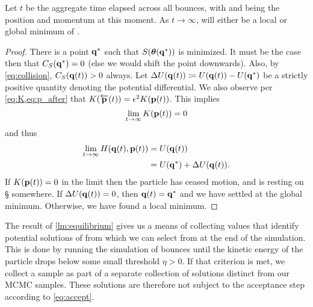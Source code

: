 \begin{lemma}
    \label{lm:equilibrium}
    Let $t$ be the aggregate time elapsed across all bounces, with \qt{} and
    \pt{} being the position and momentum at this moment. As $t \rightarrow
    \infty$, \thetaof{\qt{}} will either be a local or global minimum of
    \surface{}.
\end{lemma}
\begin{proof}
    There is a point $\mathbf{q}{}^*$ such that $S(\boldsymbol{\theta}(\mathbf{q}{}^*))$ is minimized.
    It must be the case then that $C_{S}({\mathbf{q}{}^*}) = 0$ (else we would shift the
    point downwards). Also, by \cref{eq:collision}, $C_{S}({\mathbf{q}(t){}}) > 0$ always.
    Let $\Delta U(\mathbf{q}(t){}) \coloneqq U(\mathbf{q}(t){}) - U(\mathbf{q}{}^*)$ be a strictly positive
    quantity denoting the potential differential. We also observe per
    \cref{eq:K,eq:p_after} that $K(\overleftarrow{\mathbf{p}}(t)) = \epsilon^2
    K(\mathbf{p}(t){})$. This implies
    \begin{equation*}
        \lim_{t \rightarrow \infty} K(\mathbf{p}(t){}) = 0
    \end{equation*}
    and thus
    \begin{align*}
        \lim_{t \rightarrow \infty} H(\mathbf{q}(t){}, \mathbf{p}(t){}) &= U(\mathbf{q}(t){}) \\
        &= U(\mathbf{q}{}^*) + \Delta U(\mathbf{q}(t){}).
    \end{align*}
    If $K(\mathbf{p}(t){}) = 0$ in the limit then the particle has ceased motion, and is
    resting on \S{} somewhere. If $\Delta U(\mathbf{q}(t){}) = 0$, then $\mathbf{q}(t){} = \mathbf{q}{}^*$
    and we have settled at the global minimum. Otherwise, we have found a local
    minimum.
\end{proof}

The result of \cref{lm:equilibrium} gives us a means of collecting values
\thetab{} that identify potential solutions of \target{} from which we can
select from at the end of the simulation. This is done by running the simulation
of bounces until the kinetic energy of the particle drops below some small
threshold $\eta > 0$. If that criterion is met, we collect a sample as part of a
separate collection of solutions distinct from our MCMC samples. These solutions
are therefore not subject to the acceptance step according to \cref{eq:accept}.

